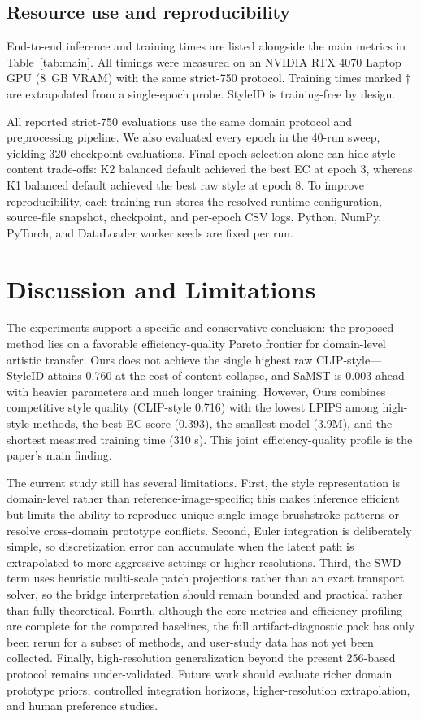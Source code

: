 ﻿\documentclass[letterpaper]{article}
\begin{document}
\subsection{Resource use and reproducibility}
End-to-end inference and training times are listed alongside the main metrics in Table~\ref{tab:main}. All timings were measured on an NVIDIA RTX 4070 Laptop GPU (8~GB VRAM) with the same strict-750 protocol. Training times marked $\dagger$ are extrapolated from a single-epoch probe. StyleID is training-free by design.

All reported strict-750 evaluations use the same domain protocol and preprocessing pipeline. We also evaluated every epoch in the 40-run sweep, yielding 320 checkpoint evaluations. Final-epoch selection alone can hide style-content trade-offs: K2 balanced default achieved the best EC at epoch 3, whereas K1 balanced default achieved the best raw style at epoch 8. To improve reproducibility, each training run stores the resolved runtime configuration, source-file snapshot, checkpoint, and per-epoch CSV logs. Python, NumPy, PyTorch, and DataLoader worker seeds are fixed per run.



\section{Discussion and Limitations}
The experiments support a specific and conservative conclusion: the proposed method lies on a favorable efficiency-quality Pareto frontier for domain-level artistic transfer. Ours does not achieve the single highest raw CLIP-style---StyleID attains 0.760 at the cost of content collapse, and SaMST is 0.003 ahead with heavier parameters and much longer training. However, Ours combines competitive style quality (CLIP-style 0.716) with the lowest LPIPS among high-style methods, the best EC score (0.393), the smallest model (3.9M), and the shortest measured training time (310 s). This joint efficiency-quality profile is the paper's main finding.

The current study still has several limitations. First, the style representation is domain-level rather than reference-image-specific; this makes inference efficient but limits the ability to reproduce unique single-image brushstroke patterns or resolve cross-domain prototype conflicts. Second, Euler integration is deliberately simple, so discretization error can accumulate when the latent path is extrapolated to more aggressive settings or higher resolutions. Third, the SWD term uses heuristic multi-scale patch projections rather than an exact transport solver, so the bridge interpretation should remain bounded and practical rather than fully theoretical. Fourth, although the core metrics and efficiency profiling are complete for the compared baselines, the full artifact-diagnostic pack has only been rerun for a subset of methods, and user-study data has not yet been collected. Finally, high-resolution generalization beyond the present 256-based protocol remains under-validated. Future work should evaluate richer domain prototype priors, controlled integration horizons, higher-resolution extrapolation, and human preference studies.
\end{document}
